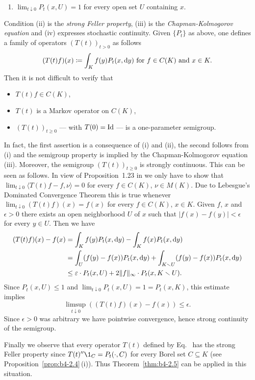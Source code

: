 \begin{example}
\begin{enumerate}[\upshape (i)]
    \item 
    $\lim_{t\downarrow0} P_t(x,U) = 1$ for every open set $U$ containing $x$.
\end{enumerate}
Condition (ii) is the \emph{strong Feller property}, (iii) is the \emph{Chapman-Kolmogorov equation} and (iv) expresses stochastic continuity.
Given $\{P_t\}$ as above, one defines a family of operators $(T(t))_{t>0}$ as follows
\begin{equation}\label{eq:b4-2.4}
    (T(t)f)(x)  \coloneq  \int_K f(y)P_t(x,\mathop{}\!\mathrm{d}{y})  \text{ for } f \in C(K)  \text{ and } x \in K .
\end{equation}
Then it is not difficult to verify that 
\begin{itemize}[-] 
    \item 
    $T(t)f \in C(K)$, 
    \item 
    $T(t)$ is a Markov operator on $C(K)$, 
    \item 
    $(T(t))_{t \geq 0}$ --- with $T(0) = \operatorname{Id} $ --- is a one-parameter semigroup.
\end{itemize}
In fact, the first assertion is a consequence of (i) and (ii), the second follows from (i) and the semigroup property is implied by the Chapman-Kolmogorov equation (iii).
Moreover, the semigroup $(T(t))_{t \geq 0}$ is strongly continuous.
This can be seen as follows. 
In view of Proposition~1.23 in \textcite{davies:1980} we only have
to show that $\lim_{t\downarrow 0}\langle T(t)f-f,\nu\rangle = 0$ for every $f \in C(K)$, $\nu \in M(K)$.
Due to Lebesgue's Dominated Convergence Theorem this is true whenever
$\lim_{t\downarrow0}(T(t)f)(x) = f(x)$ for every $f \in C(K)$, $x \in K$.
Given $f$, $x$
and $\epsilon > 0$ there exists an open neighborhood $U$ of\/ $x$ such that
$|f(x) - f(y)| < \epsilon$ for every $y \in U$.
Then we have
\begin{align*} 
    (T(t)f)(x) - f(x) &= \int_K f(y)P_t(x,\dy) - \int_K f(x)P_t(x,\dy) \\
    &= \int_U (f(y)-f(x))P_t(x,\dy) + \int_{K\setminus U} (f(y)-f(x))P_t(x,\dy)  \\
    &\leq \epsilon\cdot P_t(x,U) + 2\|f\|_{\infty}\cdot P_t(x,K\setminus U) .
\end{align*}
Since $P_t(x,U) \leq 1$ and $\lim_{t\downarrow0} P_t(x,U) = 1 = P_t(x,K)$, this estimate
implies %
\[
	\limsup_{t\downarrow 0}((T(t)f)(x) - f(x)) \leq \epsilon .
\]
%
Since $\epsilon > 0$ was arbitrary we have pointwise convergence, hence strong continuity of the semigroup.

Finally we observe that every operator $T(t)$ defined by Eq.~ has the
strong Feller property since $T(t)''\1_C = P_t(\cdot,C)$ for every Borel set
$C \subseteq K$ (see Proposition~\ref{prop:b4-2.4}\,(i)).
Thus Theorem~\ref{thm:b4-2.5} can be applied in this situation.
\end{example}
